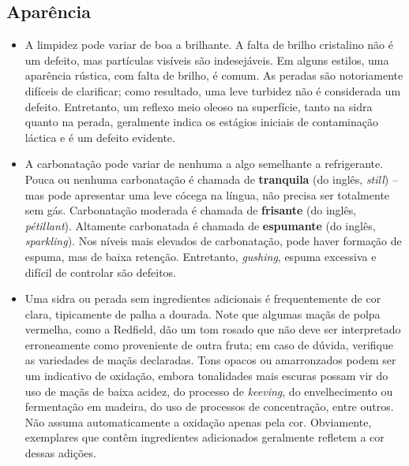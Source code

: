 \subsection*{Aparência}

\begin{itemize}
\item A limpidez pode variar de boa a brilhante. A falta de brilho cristalino não é um defeito, mas partículas visíveis são indesejáveis. Em alguns estilos, uma aparência rústica, com falta de brilho, é comum. As peradas são notoriamente difíceis de clarificar; como resultado, uma leve turbidez não é considerada um defeito. Entretanto, um reflexo meio oleoso na superfície, tanto na sidra quanto na perada, geralmente indica os estágios iniciais de contaminação láctica e é um defeito evidente.
\item A carbonatação pode variar de nenhuma a algo semelhante a refrigerante. Pouca ou nenhuma carbonatação é chamada de \textbf{tranquila} (do inglês, \textit{still}) – mas pode apresentar uma leve cócega na língua, não precisa ser totalmente sem gás. Carbonatação moderada é chamada de \textbf{frisante} (do inglês, \textit{pétillant}). Altamente carbonatada é chamada de \textbf{espumante} (do inglês, \textit{sparkling}). Nos níveis mais elevados de carbonatação, pode haver formação de espuma, mas de baixa retenção. Entretanto, \textit{gushing}, espuma excessiva e difícil de controlar são defeitos.
\item Uma sidra ou perada sem ingredientes adicionais é frequentemente de cor clara, tipicamente de palha a dourada. Note que algumas maçãs de polpa vermelha, como a Redfield, dão um tom rosado que não deve ser interpretado erroneamente como proveniente de outra fruta; em caso de dúvida, verifique as variedades de maçãs declaradas. Tons opacos ou amarronzados podem ser um indicativo de oxidação, embora tonalidades mais escuras possam vir do uso de maçãs de baixa acidez, do processo de \textit{keeving}, do envelhecimento ou fermentação em madeira, do uso de processos de concentração, entre outros. Não assuma automaticamente a oxidação apenas pela cor. Obviamente, exemplares que contêm ingredientes adicionados geralmente refletem a cor dessas adições.
\end{itemize}
